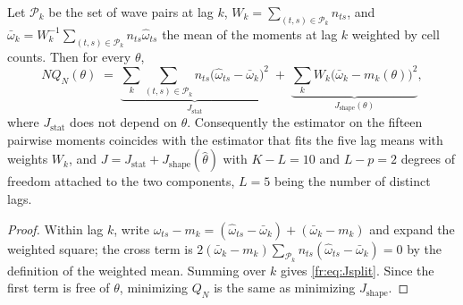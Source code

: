 \begin{proposition}
\label{fr:prop:Jsplit}
Let $\mathcal P_k$ be the set of wave pairs at lag $k$,
$W_k = \sum_{(t,s)\in\mathcal P_k}n_{ts}$, and
$\bar\omega_k = W_k^{-1}\sum_{(t,s)\in\mathcal P_k}n_{ts}\hat\omega_{ts}$
the mean of the moments at lag $k$ weighted by cell counts. Then for
every $\theta$,
\begin{equation}
N Q_N(\theta) \;=\; \underbrace{\sum_{k}\sum_{(t,s)\in\mathcal P_k} n_{ts}\big(\hat\omega_{ts} - \bar\omega_k\big)^2}_{J_{\mathrm{stat}}}
\;+\; \underbrace{\sum_{k} W_k\big(\bar\omega_k - m_k(\theta)\big)^2}_{J_{\mathrm{shape}}(\theta)} ,
\label{fr:eq:Jsplit}
\end{equation}
where $J_{\mathrm{stat}}$ does not depend on $\theta$. Consequently the
estimator on the fifteen pairwise moments coincides with the estimator
that fits the five lag means with weights $W_k$, and
$J = J_{\mathrm{stat}} + J_{\mathrm{shape}}(\hat\theta)$ with
$K - L = 10$ and $L - p = 2$ degrees of freedom attached to the two
components, $L = 5$ being the number of distinct lags.
\end{proposition}

\begin{proof}
Within lag $k$, write
$\hat\omega_{ts} - m_k = (\hat\omega_{ts} - \bar\omega_k) + (\bar\omega_k - m_k)$
and expand the weighted square; the cross term is
$2(\bar\omega_k - m_k)\sum_{\mathcal P_k}n_{ts}(\hat\omega_{ts} - \bar\omega_k) = 0$
by the definition of the weighted mean. Summing over $k$ gives
\eqref{fr:eq:Jsplit}. Since the first term is free of $\theta$, minimizing
$Q_N$ is the same as minimizing $J_{\mathrm{shape}}$.
\end{proof}

